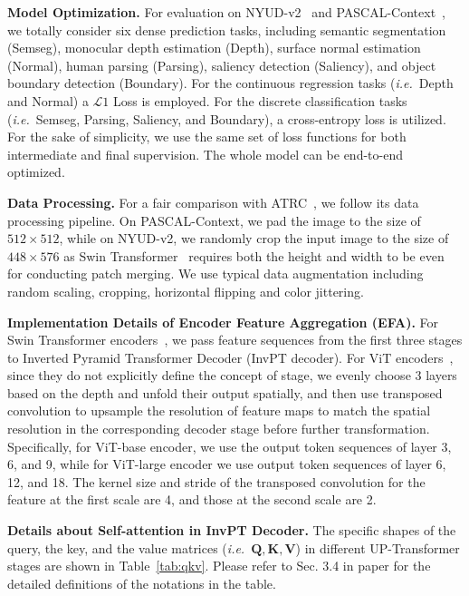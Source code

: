\documentclass[runningheads]{llncs}
\newcommand*{\ie}{\emph{i.e.}}
\begin{document}
\par\noindent\textbf{Model Optimization.} For evaluation on NYUD-v2~\cite{silberman2012indoor} and PASCAL-Context~\cite{chen2014detect}, we totally consider six dense prediction tasks, including
semantic segmentation (Semseg), monocular depth estimation (Depth),  surface normal estimation (Normal), human parsing (Parsing), saliency detection (Saliency), and object boundary detection (Boundary).
For the continuous regression tasks (\ie~Depth and Normal)
a $\mathcal{L}1$ Loss is employed. For the discrete classification tasks (\ie~Semseg, Parsing, Saliency, and Boundary), a cross-entropy loss is utilized.
For the sake of simplicity, we use the same set of loss functions for both intermediate and final supervision.
The whole model can be end-to-end optimized.


\par\noindent\textbf{Data Processing.} For a fair comparison with ATRC~\cite{atrc}, we follow its data processing pipeline. On PASCAL-Context, we pad the image to the size of $512\times 512$, while on NYUD-v2, we randomly crop the input image to the size of $448\times 576$ as Swin Transformer~\cite{swin} requires both the height and width to be even for conducting patch merging. We use typical data augmentation including random scaling, cropping, horizontal flipping and color jittering.

\par\noindent\textbf{Implementation Details of Encoder Feature Aggregation (EFA).}
For Swin Transformer encoders~\cite{swin}, we pass feature sequences from the first three stages to Inverted Pyramid Transformer Decoder (InvPT decoder).
For ViT encoders~\cite{vit}, since they do not explicitly define the concept of stage, we evenly choose 3 layers based on the depth and unfold their output spatially, and then use transposed convolution to upsample the resolution of feature maps to match the spatial resolution in the corresponding decoder stage before further transformation.
Specifically, for ViT-base encoder, we use the output token sequences of layer 3, 6, and 9, while for ViT-large encoder we use output token sequences of layer 6, 12, and 18.
The kernel size and stride of the transposed convolution for the feature at the first scale are 4, and those at the second scale are 2.

\par\noindent\textbf{Details about Self-attention in InvPT Decoder.} The specific shapes of the query, the key, and the value matrices (\ie~$\mathbf{Q}, \mathbf{K}, \mathbf{V}$) in different UP-Transformer stages are shown in Table~\ref{tab:qkv}. Please refer to Sec. 3.4 in paper for the detailed definitions of the notations in the table.
\end{document}
